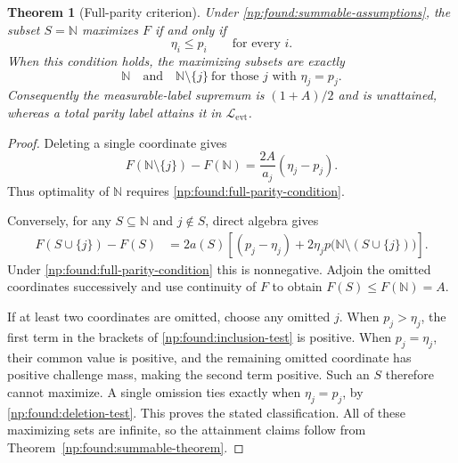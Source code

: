 \documentclass[11pt,a4paper]{article}
\newtheorem{theorem}{Theorem}[section]
\theoremstyle{definition}
\theoremstyle{remark}
\newcommand{\N}{\mathbb N}
\begin{document}
\begin{theorem}[Full-parity criterion]
\label{np:found:full-parity}
Under \eqref{np:found:summable-assumptions}, the subset $S=\N$
maximizes $F$ if and only if
\begin{equation}
 \eta_i\le p_i\qquad\text{for every }i.
 \label{np:found:full-parity-condition}
\end{equation}
When this condition holds, the maximizing subsets are exactly
\[
 \N\quad\text{and}\quad
 \N\setminus\{j\}\ \text{for those }j\text{ with }\eta_j=p_j.
\]
Consequently the measurable-label supremum is $(1+A)/2$ and is
unattained, whereas a total parity label attains it in $\mathcal L_{\mathrm{evt}}$.
\end{theorem}

\begin{proof}
Deleting a single coordinate gives
\begin{equation}
 F(\N\setminus\{j\})-F(\N)
 =\frac{2A}{a_j}(\eta_j-p_j).
 \label{np:found:deletion-test}
\end{equation}
Thus optimality of $\N$ requires
\eqref{np:found:full-parity-condition}.

Conversely, for any $S\subseteq\N$ and $j\notin S$, direct algebra
gives
\begin{align}
 F(S\cup\{j\})-F(S)
 &=2a(S)\left[(p_j-\eta_j)
 +2\eta_j p\bigl(\N\setminus(S\cup\{j\})\bigr)\right].
 \label{np:found:inclusion-test}
\end{align}
Under \eqref{np:found:full-parity-condition} this is nonnegative.
Adjoin the omitted coordinates successively and use continuity of $F$
to obtain $F(S)\le F(\N)=A$.

If at least two coordinates are omitted, choose any omitted $j$.
When $p_j>\eta_j$, the first term in the brackets of
\eqref{np:found:inclusion-test} is positive.  When
$p_j=\eta_j$, their common value is positive, and the remaining
omitted coordinate has positive challenge mass, making the second
term positive.  Such an $S$ therefore cannot maximize.  A single
omission ties exactly when $\eta_j=p_j$, by
\eqref{np:found:deletion-test}.  This proves the stated classification.
All of these maximizing sets are infinite, so the attainment claims
follow from Theorem~\ref{np:found:summable-theorem}.
\end{proof}
\end{document}
